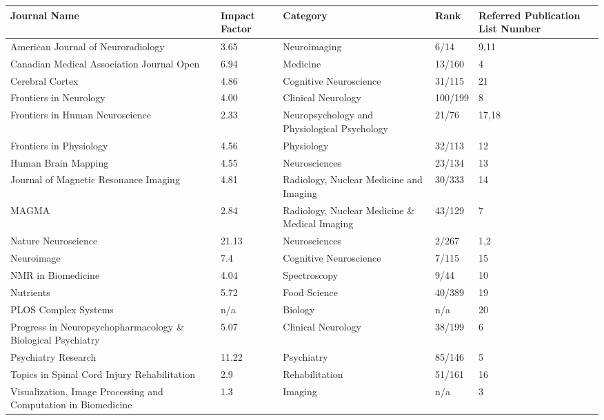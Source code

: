 \documentclass[11pt,notitlepage,english]{report}
\begin{document}
\newcommand{\ifajnr}{3.65}
\newcommand{\ifcmajo}{6.94}
\newcommand{\ifcercor}{4.86}
\newcommand{\iffrontneur}{4.00}
\newcommand{\iffronthum}{2.33}
\newcommand{\iffrontphys}{4.56}
\newcommand{\ifhbm}{4.55}
\newcommand{\ifjmri}{4.81}
\newcommand{\ifmagma}{2.84}
\newcommand{\ifnatneur}{21.13}
\newcommand{\ifneurimag}{7.4}
\newcommand{\ifnmr}{4.04}
\newcommand{\ifnutrients}{5.72}
\newcommand{\ifprog}{5.07}
\newcommand{\ifpsych}{11.22}
\newcommand{\iftopics}{2.9}
\newcommand{\ifvisual}{1.3}
\begin{longtable}{| L{5cm} | L{2cm} | L{3.5cm} | L{2.5cm} | L{2.5cm} |}
  \hline
  \textbf{Journal Name}    & \textbf{Impact Factor} & \textbf{Category} & \textbf{Rank} & \textbf{Referred Publication List Number} \\
  \hline
  American Journal of Neuroradiology & \ifajnr & Neuroimaging & 6/14 & 9,11 \\
  \hline
  Canadian Medical Association Journal Open & \ifcmajo & Medicine & 13/160 & 4 \\
  \hline
  Cerebral Cortex & \ifcercor & Cognitive Neuroscience & 31/115 & 21 \\
  \hline
  Frontiers in Neurology & \iffrontneur & Clinical Neurology & 100/199 & 8 \\
  \hline
  Frontiers in Human Neuroscience & \iffronthum & Neuropsychology and Physiological Psychology & 21/76 & 17,18 \\
  \hline
  Frontiers in Physiology & \iffrontphys & Physiology & 32/113 & 12 \\
  \hline
  Human Brain Mapping & \ifhbm & Neurosciences & 23/134 & 13 \\
  \hline
  Journal of Magnetic Resonance Imaging & \ifjmri & Radiology, Nuclear Medicine and Imaging & 30/333 & 14 \\
  \hline
  MAGMA & \ifmagma & Radiology, Nuclear Medicine \& Medical Imaging & 43/129 & 7 \\
  \hline
  Nature Neuroscience & \ifnatneur & Neurosciences & 2/267 & 1,2 \\
  \hline
  Neuroimage & \ifneurimag & Cognitive Neuroscience & 7/115 & 15 \\
  \hline
  NMR in Biomedicine & \ifnmr & Spectroscopy & 9/44 & 10 \\
  \hline
  Nutrients & \ifnutrients & Food Science & 40/389 & 19\\ 
  \hline
  PLOS Complex Systems & n/a & Biology & n/a & 20 \\
  \hline
  Progress in Neuropsychopharmacology \& Biological Psychiatry & \ifprog & Clinical Neurology & 38/199 & 6 \\
  \hline
  Psychiatry Research & \ifpsych & Psychiatry & 85/146 & 5 \\
  \hline
  Topics in Spinal Cord Injury Rehabilitation & \iftopics & Rehabilitation & 51/161 & 16 \\
  \hline
  Visualization, Image Processing and Computation in Biomedicine & \ifvisual & Imaging & n/a & 3 \\
  \hline
\end{longtable}
\end{document}
